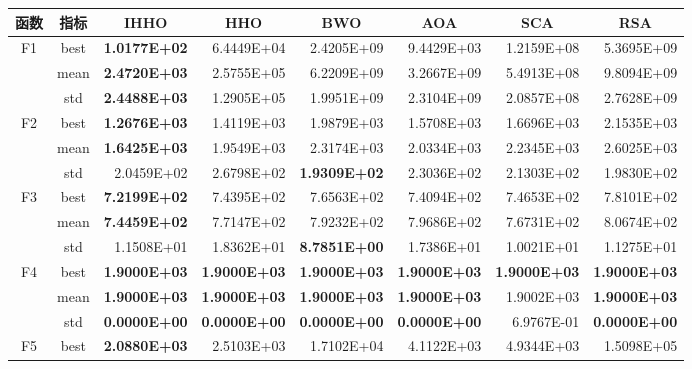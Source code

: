 \documentclass{wzuthesis}
\begin{document}
\begin{table}[htbp]
  \small
  \centering
  \label{tb:CEC2020-dim10}
    \begin{tabular}{ccrrrrrr}
        \toprule
    函数    & 指标    & \multicolumn{1}{c}{IHHO} & \multicolumn{1}{c}{HHO} & \multicolumn{1}{c}{BWO} & \multicolumn{1}{c}{AOA} & \multicolumn{1}{c}{SCA} & \multicolumn{1}{c}{RSA} \\
    \midrule
    \multirow{3}[0]{*}{F1} & best  & \textbf{1.0177E+02} & 6.4449E+04 & 2.4205E+09 & 9.4429E+03 & 1.2159E+08 & 5.3695E+09 \\
          & mean  & \textbf{2.4720E+03} & 2.5755E+05 & 6.2209E+09 & 3.2667E+09 & 5.4913E+08 & 9.8094E+09 \\
          & std   & \textbf{2.4488E+03} & 1.2905E+05 & 1.9951E+09 & 2.3104E+09 & 2.0857E+08 & 2.7628E+09 \\
    \multirow{3}[0]{*}{F2} & best  & \textbf{1.2676E+03} & 1.4119E+03 & 1.9879E+03 & 1.5708E+03 & 1.6696E+03 & 2.1535E+03 \\
          & mean  & \textbf{1.6425E+03} & 1.9549E+03 & 2.3174E+03 & 2.0334E+03 & 2.2345E+03 & 2.6025E+03 \\
          & std   & 2.0459E+02 & 2.6798E+02 & \textbf{1.9309E+02} & 2.3036E+02 & 2.1303E+02 & 1.9830E+02 \\
    \multirow{3}[0]{*}{F3} & best  & \textbf{7.2199E+02} & 7.4395E+02 & 7.6563E+02 & 7.4094E+02 & 7.4653E+02 & 7.8101E+02 \\
          & mean  & \textbf{7.4459E+02} & 7.7147E+02 & 7.9232E+02 & 7.9686E+02 & 7.6731E+02 & 8.0674E+02 \\
          & std   & 1.1508E+01 & 1.8362E+01 & \textbf{8.7851E+00} & 1.7386E+01 & 1.0021E+01 & 1.1275E+01 \\
    \multirow{3}[0]{*}{F4} & best  & \textbf{1.9000E+03} & \textbf{1.9000E+03} & \textbf{1.9000E+03} & \textbf{1.9000E+03} & \textbf{1.9000E+03} & \textbf{1.9000E+03} \\
          & mean  & \textbf{1.9000E+03} & \textbf{1.9000E+03} & \textbf{1.9000E+03} & \textbf{1.9000E+03} & 1.9002E+03 & \textbf{1.9000E+03} \\
          & std   & \textbf{0.0000E+00} & \textbf{0.0000E+00} & \textbf{0.0000E+00} & \textbf{0.0000E+00} & 6.9767E-01 & \textbf{0.0000E+00} \\
    \multirow{3}[0]{*}{F5} & best  & \textbf{2.0880E+03} & 2.5103E+03 & 1.7102E+04 & 4.1122E+03 & 4.9344E+03 & 1.5098E+05 \\

\end{tabular}
\end{table}
\end{document}
